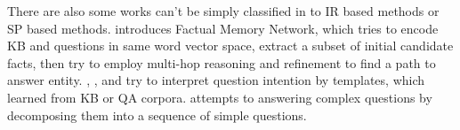 
There are also some works can't be simply classified in to IR based methods or SP based methods.   \citet{jain2016question}  introduces Factual Memory Network,  which tries to encode KB and questions in same word vector space,  extract a subset of initial candidate facts,  then try to employ multi-hop reasoning and refinement to find a path to answer entity.   \citet{reddy2016transforming},  \citet{abujabal2017automated}, and \citet{cui2017kbqa} try to interpret question intention by templates,  which learned from KB or QA corpora.   \citet{talmor2018web}  attempts to answering complex questions by decomposing them into a sequence of simple questions. 

%  




